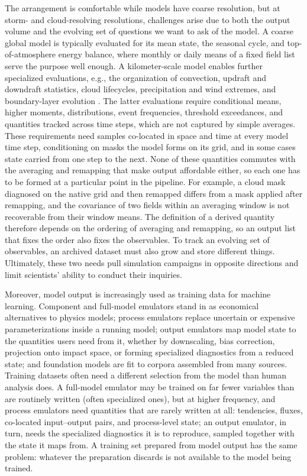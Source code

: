 \documentclass[gmd, manuscript]{copernicus}
\begin{document}
The arrangement is comfortable while models have coarse resolution, but at storm- and cloud-resolving resolutions, challenges arise due to both the output volume \citep{balaji_requirements_2018} and the evolving set of questions we want to ask of the model. A coarse global model is typically evaluated for its mean state, the seasonal cycle, and top-of-atmosphere energy balance, where monthly or daily means of a fixed field list serve the purpose well enough. A kilometer-scale model enables further specialized evaluations, e.g., the organization of convection, updraft and downdraft statistics, cloud lifecycles, precipitation and wind extremes, and boundary-layer evolution \citep{caldwell_convectionpermitting_2021,donahue_exascale_2024}. The latter evaluations require conditional means, higher moments, distributions, event frequencies, threshold exceedances, and quantities tracked across time steps, which are not captured by simple averages. These requirements need samples co-located in space and time at every model time step, conditioning on masks the model forms on its grid, and in some cases state carried from one step to the next. None of these quantities commutes with the averaging and remapping that make output affordable either, so each one has to be formed at a particular point in the pipeline. For example, a cloud mask diagnosed on the native grid and then remapped differs from a mask applied after remapping, and the covariance of two fields within an averaging window is not recoverable from their window means. The definition of a derived quantity therefore depends on the ordering of averaging and remapping, so an output list that fixes the order also fixes the observables. To track an evolving set of observables, an archived dataset must also grow and store different things. Ultimately, these two needs pull simulation campaigns in opposite directions and limit scientists' ability to conduct their inquiries.

Moreover, model output is increasingly used as training data for machine learning. Component and full-model emulators stand in as economical alternatives to physics models; process emulators replace uncertain or expensive parameterizations inside a running model; output emulators map model state to the quantities users need from it, whether by downscaling, bias correction, projection onto impact space, or forming specialized diagnostics from a reduced state; and foundation models are fit to corpora assembled from many sources.
Training datasets often need a different selection from the model than human analysis does. A full-model emulator may be trained on far fewer variables than are routinely written (often specialized ones), but at higher frequency, and process emulators need quantities that are rarely written at all: tendencies, fluxes, co-located input--output pairs, and process-level state; an output emulator, in turn, needs the specialized diagnostics it is to reproduce, sampled together with the state it maps from. A training set prepared from model output has the same problem: whatever the preparation discards is not available to the model being trained.
\end{document}

